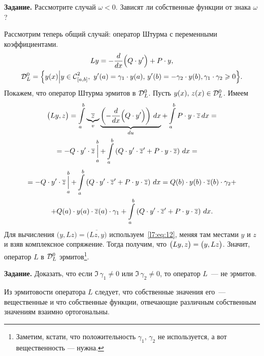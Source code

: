 \noindent\textbf{Задание.} Рассмотрите случай $\omega<0$. Зависят ли собственные функции от знака $\omega$?
\vspace{0.2cm}

Рассмотрим теперь общий случай: оператор Штурма с переменными коэффициентами.
\begin{multline*}
	Ly=-\der{}{x}\Big(Q\cdot y'\Big)+P\cdot y,\\\mc{D}_{L}^{0}=\Big\{y(x)\Big|y\in\Cfn[{[a,b]}]{2},\ y'(a)=\gamma_1\cdot y(a),\,y'(b)=-\gamma_2\cdot y(b), \gamma_1\cdot\gamma_2\geqslant0\Big\}.
\end{multline*}
Покажем, что оператор Штурма эрмитов в $\mc{D}_{L}^{0}$. Пусть $y(x),\,z(x)\in\mc{D}_{L}^{0}$. Имеем 
\begin{multline*}
	\big(Ly,z\big)=\int\limits_a^b\underbrace{\overline{z}}_{v}\underbrace{\left(-\der{}{x}\Big(Q\cdot y'\Big)\right)\,dx}_{du}+\int\limits_a^b P\cdot y\cdot\overline{z}\,dx=\\
	=-Q\cdot y'\cdot \overline{z}\mathop{\Big|}\limits_a^b+\int\limits_a^b\left(Q\cdot y'\cdot\overline{z}'+P\cdot y\cdot\overline{z}\right)\,dx=\hfil	
\end{multline*}	
\begin{multline}
	\label{l7:eq:12}
	\hfil=-Q\cdot y'\cdot \overline{z}\mathop{\Big|}\limits_a^b+\int\limits_a^b\left(Q\cdot y'\cdot\overline{z}'+P\cdot y\cdot\overline{z}\right)\,dx
	=Q(b)\cdot y(b)\cdot\overline{z}(b)\cdot\gamma_2+\\+Q(a)\cdot y(a)\cdot\overline{z}(a)\cdot\gamma_1+\int\limits_a^b\left(Q\cdot y'\cdot\overline{z}'+P\cdot y\cdot\overline{z}\right)\,dx.
\end{multline}
Для вычисления $\big(y,Lz\big)=\overline{\big(Lz,y\big)}$ используем~\eqref{l7:eq:12}, меняя там местами $y$ и $z$ и взяв комплексное сопряжение. Тогда получим, что $\big(Ly,z\big)\?=\big(y,Lz\big)$. Значит, оператор $L$ в $\mc{D}_{L}^{0}$ эрмитов\footnote{Заметим, кстати, что положительность $\gamma_1$, $\gamma_2$ не используется, а вот вещественность --- нужна.}.
\vspace{0.2cm}

\noindent\textbf{Задание.} Доказать, что если $\Im\,\gamma_1\neq0$ или $\Im\,\gamma_2\neq0$, то оператор $L$~--- не эрмитов.
\vspace{0.2cm}

Из эрмитовости оператора $L$ следует, что собственные значения его~--- вещественные и что собственные функции, отвечающие различным собственным значениям взаимно ортогональны.

